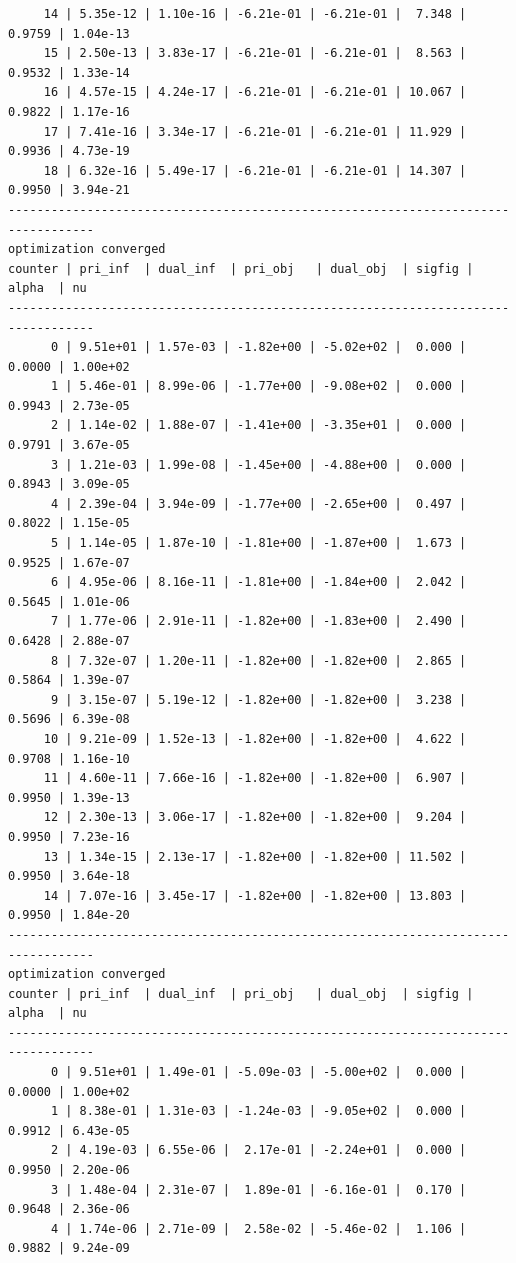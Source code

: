 \documentclass[
]{book}
\begin{document}
\begin{verbatim}
     14 | 5.35e-12 | 1.10e-16 | -6.21e-01 | -6.21e-01 |  7.348 | 0.9759 | 1.04e-13
     15 | 2.50e-13 | 3.83e-17 | -6.21e-01 | -6.21e-01 |  8.563 | 0.9532 | 1.33e-14
     16 | 4.57e-15 | 4.24e-17 | -6.21e-01 | -6.21e-01 | 10.067 | 0.9822 | 1.17e-16
     17 | 7.41e-16 | 3.34e-17 | -6.21e-01 | -6.21e-01 | 11.929 | 0.9936 | 4.73e-19
     18 | 6.32e-16 | 5.49e-17 | -6.21e-01 | -6.21e-01 | 14.307 | 0.9950 | 3.94e-21
----------------------------------------------------------------------------------
optimization converged
counter | pri_inf  | dual_inf  | pri_obj   | dual_obj  | sigfig | alpha  | nu 
----------------------------------------------------------------------------------
      0 | 9.51e+01 | 1.57e-03 | -1.82e+00 | -5.02e+02 |  0.000 | 0.0000 | 1.00e+02
      1 | 5.46e-01 | 8.99e-06 | -1.77e+00 | -9.08e+02 |  0.000 | 0.9943 | 2.73e-05
      2 | 1.14e-02 | 1.88e-07 | -1.41e+00 | -3.35e+01 |  0.000 | 0.9791 | 3.67e-05
      3 | 1.21e-03 | 1.99e-08 | -1.45e+00 | -4.88e+00 |  0.000 | 0.8943 | 3.09e-05
      4 | 2.39e-04 | 3.94e-09 | -1.77e+00 | -2.65e+00 |  0.497 | 0.8022 | 1.15e-05
      5 | 1.14e-05 | 1.87e-10 | -1.81e+00 | -1.87e+00 |  1.673 | 0.9525 | 1.67e-07
      6 | 4.95e-06 | 8.16e-11 | -1.81e+00 | -1.84e+00 |  2.042 | 0.5645 | 1.01e-06
      7 | 1.77e-06 | 2.91e-11 | -1.82e+00 | -1.83e+00 |  2.490 | 0.6428 | 2.88e-07
      8 | 7.32e-07 | 1.20e-11 | -1.82e+00 | -1.82e+00 |  2.865 | 0.5864 | 1.39e-07
      9 | 3.15e-07 | 5.19e-12 | -1.82e+00 | -1.82e+00 |  3.238 | 0.5696 | 6.39e-08
     10 | 9.21e-09 | 1.52e-13 | -1.82e+00 | -1.82e+00 |  4.622 | 0.9708 | 1.16e-10
     11 | 4.60e-11 | 7.66e-16 | -1.82e+00 | -1.82e+00 |  6.907 | 0.9950 | 1.39e-13
     12 | 2.30e-13 | 3.06e-17 | -1.82e+00 | -1.82e+00 |  9.204 | 0.9950 | 7.23e-16
     13 | 1.34e-15 | 2.13e-17 | -1.82e+00 | -1.82e+00 | 11.502 | 0.9950 | 3.64e-18
     14 | 7.07e-16 | 3.45e-17 | -1.82e+00 | -1.82e+00 | 13.803 | 0.9950 | 1.84e-20
----------------------------------------------------------------------------------
optimization converged
counter | pri_inf  | dual_inf  | pri_obj   | dual_obj  | sigfig | alpha  | nu 
----------------------------------------------------------------------------------
      0 | 9.51e+01 | 1.49e-01 | -5.09e-03 | -5.00e+02 |  0.000 | 0.0000 | 1.00e+02
      1 | 8.38e-01 | 1.31e-03 | -1.24e-03 | -9.05e+02 |  0.000 | 0.9912 | 6.43e-05
      2 | 4.19e-03 | 6.55e-06 |  2.17e-01 | -2.24e+01 |  0.000 | 0.9950 | 2.20e-06
      3 | 1.48e-04 | 2.31e-07 |  1.89e-01 | -6.16e-01 |  0.170 | 0.9648 | 2.36e-06
      4 | 1.74e-06 | 2.71e-09 |  2.58e-02 | -5.46e-02 |  1.106 | 0.9882 | 9.24e-09

\end{verbatim}
\end{document}
